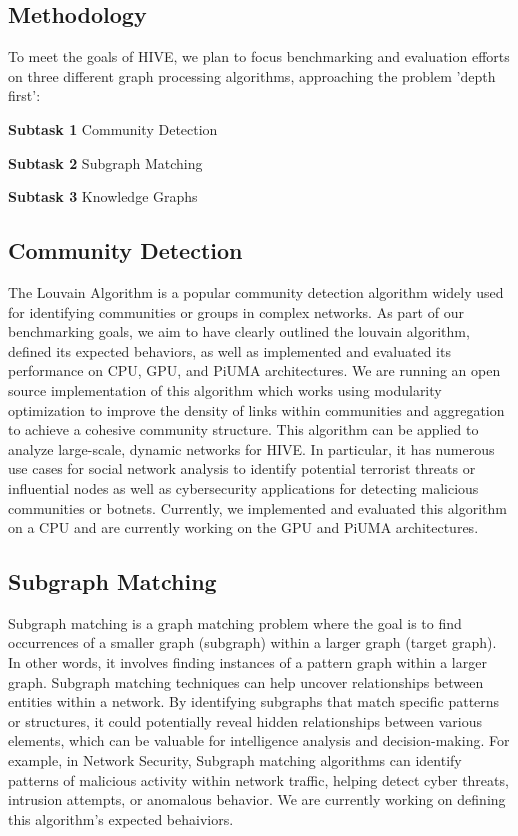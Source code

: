 \documentclass[letterpaper, 10pt]{article}
\begin{document}
\begin{multicols}{2}
    \section{Methodology}
    To meet the goals of HIVE, we plan to focus benchmarking and evaluation efforts on three different graph processing algorithms, approaching the problem 'depth first':
    \newline
    
        \textbf{Subtask 1} Community Detection
        
        \textbf{Subtask 2} Subgraph Matching
        
        \textbf{Subtask 3} Knowledge Graphs

        
        \subsection{Community Detection}
            The Louvain Algorithm is a popular community detection algorithm widely used for identifying communities or groups in complex networks. As part of our benchmarking goals, we aim to have clearly outlined the louvain algorithm, defined its expected behaviors, as well as implemented and evaluated its performance on CPU, GPU, and PiUMA architectures. We are running an open source implementation of this algorithm which works using modularity optimization to improve the density of links within communities and aggregation to achieve a cohesive community structure. This algorithm can be applied to analyze large-scale, dynamic networks for HIVE.  In particular, it has numerous use cases for social network analysis to identify potential terrorist threats or influential nodes as well as cybersecurity applications for detecting malicious communities or botnets. Currently, we implemented and evaluated this algorithm on a CPU and are currently working on the GPU and PiUMA architectures.
            
        \subsection{Subgraph Matching}
            Subgraph matching is a graph matching problem where the goal is to find occurrences of a smaller graph (subgraph) within a larger graph (target graph). In other words, it involves finding instances of a pattern graph within a larger graph. Subgraph matching techniques can help uncover relationships between entities within a network. By identifying subgraphs that match specific patterns or structures, it could potentially reveal hidden relationships between various elements, which can be valuable for intelligence analysis and decision-making. For example, in Network Security, Subgraph matching algorithms can identify patterns of malicious activity within network traffic, helping detect cyber threats, intrusion attempts, or anomalous behavior. We are currently working on defining this algorithm's expected behaiviors. 


\end{multicols}
\end{document}
